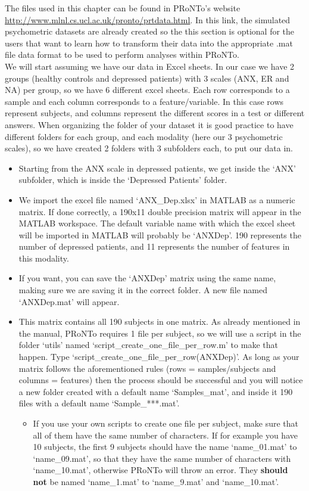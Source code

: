 The files used in this chapter can be found in PRoNTo's website \url{http://www.mlnl.cs.ucl.ac.uk/pronto/prtdata.html}. In this link, the simulated psychometric datasets are already created so the this section is optional for the users that want to learn how to transform their data into the appropriate .mat file data format to be used to perform analyses within PRoNTo.
\\

We will start assuming we have our data in Excel sheets. In our case we have 2 groups (healthy controls and depressed patients) with 3 scales (ANX, ER and NA) per group, so we have 6 different excel sheets. Each row corresponds to a sample and each column corresponds to a feature/variable. In this case rows represent subjects, and columns represent the different scores in a test or different answers. When organizing the folder of your dataset it is good practice to have different folders for each group, and each modality (here our 3 psychometric scales), so we have created 2 folders with 3 subfolders each, to put our data in.

\begin{itemize}
    \item Starting from the ANX scale in depressed patients, we get inside the `ANX' subfolder, which is inside the `Depressed Patients' folder.
    \item We import the excel file named `ANX\_Dep.xlsx' in MATLAB as a numeric matrix. If done correctly, a 190x11 double precision matrix will appear in the MATLAB workspace. The default variable name with which the excel sheet will be imported in MATLAB will probably be `ANXDep'. 190 represents the number of depressed patients, and 11 represents the number of features in this modality.
    \item If you want, you can save the `ANXDep' matrix using the same name, making sure we are saving it in the correct folder. A new file named `ANXDep.mat' will appear.
    \item This matrix contains all 190 subjects in one matrix. As already mentioned in the manual, PRoNTo requires 1 file per subject, so we will use a script in the folder `utils' named `script\_create\_one\_file\_per\_row.m' to make that happen. Type `script\_create\_one\_file\_per\_row(ANXDep)'. As long as your matrix follows the aforementioned rules (rows = samples/subjects and columns = features) then the process should be successful and you will notice a new folder created with a default name `Samples\_mat', and inside it 190 files with a default name `Sample\_***.mat'.

\begin{itemize}
\item If you use your own scripts to create one file per subject, make sure that all of them have the same number of characters. If for example you have 10 subjects, the first 9 subjects should have the name `name\_01.mat' to `name\_09.mat', so that they have the same number of characters with `name\_10.mat', otherwise PRoNTo will throw an error. They \textbf{should not} be named `name\_1.mat' to `name\_9.mat' and `name\_10.mat'.
\end{itemize}

\end{itemize}

